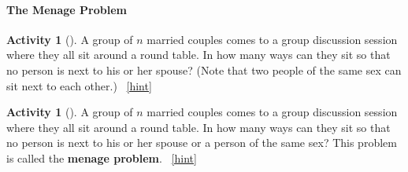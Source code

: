 \documentclass[10pt,]{book}
\newcommand{\terminology}[1]{\textbf{#1}}
\theoremstyle{plain}
\theoremstyle{definition}
\theoremstyle{definition}
\theoremstyle{definition}
\newtheorem{activity}[project]{Activity}
\numberwithin{equation}{chapter}
\begin{document}
\paragraph[{The Menage Problem}]{The Menage Problem}\hypertarget{sec-menage}{}
\begin{activity}[]\label{relaxedmenage}
\hypertarget{p-1211}{}%
A group of \(n\) married couples comes to a group discussion session where they all sit around a round table. In how many ways can they sit so that no person is next to his or her spouse? (Note that two people of the same sex can sit next to each other.)%
~\hfill{\tiny\hyperlink{a-226}{[hint]}\hypertarget{q-226}{}}\end{activity}
\begin{activity}[]\label{activity-220}
\hypertarget{p-1215}{}%
A group of \(n\) married couples comes to a group discussion session where they all sit around a round table. In how many ways can they sit so that no person is next to his or her spouse or a person of the same sex? This problem is called the \terminology{menage problem}.%
~\hfill{\tiny\hyperlink{a-227}{[hint]}\hypertarget{q-227}{}}\end{activity}
\typeout{************************************************}
\typeout{************************************************}
\end{document}
